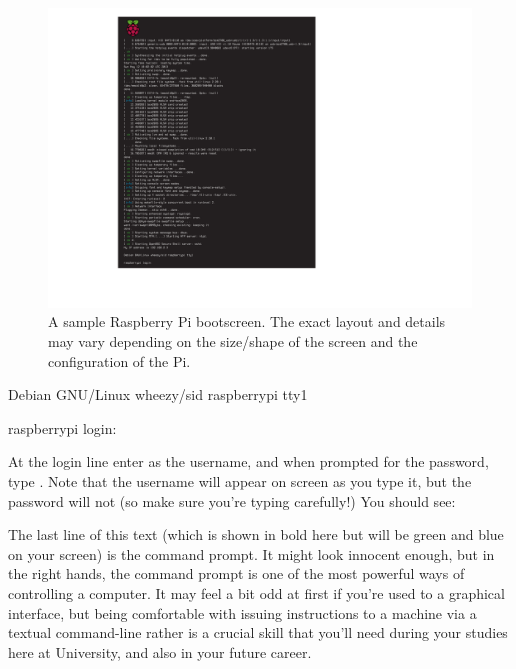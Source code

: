 \begin{figure}
\centerline{\includegraphics[width=15cm]{images/bootscreen}}
\caption{A sample Raspberry Pi bootscreen. The exact layout and details may vary depending on the size/shape of the screen and the configuration of the Pi.}\label{figure:piboot}
\end{figure}

\begin{ttoutenv}
Debian GNU/Linux wheezy/sid raspberrypi tty1

raspberrypi login:
\end{ttoutenv}

At the login line enter  as the username, and when prompted for the password, type . Note that the username will appear on screen as you type it, but the password will not (so make sure you're typing carefully!) You should see:



%

The last line of this text (which is shown in bold here but will be green and blue on your screen) is the command prompt. It might look innocent enough, but in the right hands, the command prompt is one of the most powerful ways of controlling a computer. It may feel a bit odd at first if you're used to a graphical interface, but being comfortable with issuing instructions to a machine via a textual command-line rather is a crucial skill that you'll need during your studies here at University, and also in your future career.

